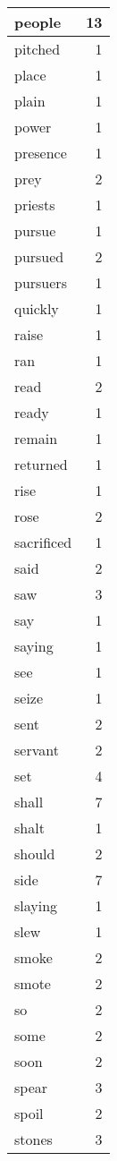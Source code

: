 \begin{center}
\begin{longtable}{l|r}
people & 13\\ \hline 
pitched & 1\\ \hline 
place & 1\\ \hline 
plain & 1\\ \hline 
power & 1\\ \hline 
presence & 1\\ \hline 
prey & 2\\ \hline 
priests & 1\\ \hline 
pursue & 1\\ \hline 
pursued & 2\\ \hline 
pursuers & 1\\ \hline 
quickly & 1\\ \hline 
raise & 1\\ \hline 
ran & 1\\ \hline 
read & 2\\ \hline 
ready & 1\\ \hline 
remain & 1\\ \hline 
returned & 1\\ \hline 
rise & 1\\ \hline 
rose & 2\\ \hline 
sacrificed & 1\\ \hline 
said & 2\\ \hline 
saw & 3\\ \hline 
say & 1\\ \hline 
saying & 1\\ \hline 
see & 1\\ \hline 
seize & 1\\ \hline 
sent & 2\\ \hline 
servant & 2\\ \hline 
set & 4\\ \hline 
shall & 7\\ \hline 
shalt & 1\\ \hline 
should & 2\\ \hline 
side & 7\\ \hline 
slaying & 1\\ \hline 
slew & 1\\ \hline 
smoke & 2\\ \hline 
smote & 2\\ \hline 
so & 2\\ \hline 
some & 2\\ \hline 
soon & 2\\ \hline 
spear & 3\\ \hline 
spoil & 2\\ \hline 
stones & 3\\ \hline 

\end{longtable}
\end{center}
